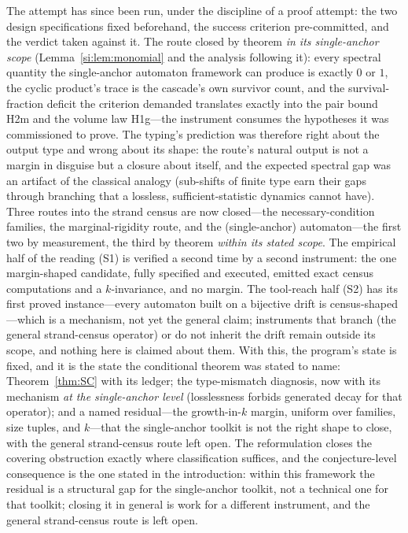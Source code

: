 \documentclass[11pt,a4paper]{article}
\numberwithin{equation}{section}
\theoremstyle{plain}
\theoremstyle{plain}
\theoremstyle{definition}
\theoremstyle{remark}
\begin{document}
The attempt has since been run, under the discipline of a proof
attempt: the two design specifications fixed beforehand, the success
criterion pre-committed, and the verdict taken against it. The route
closed by theorem \emph{in its single-anchor scope}
(Lemma~\ref{si:lem:monomial} and the analysis following it): every spectral
quantity the single-anchor automaton framework can produce is
exactly $0$ or $1$, the cyclic product's trace is the cascade's own
survivor count, and the survival-fraction deficit the criterion
demanded translates exactly into the pair bound H2m and the volume law
H1g---the instrument consumes the hypotheses it was commissioned to
prove. The typing's prediction was therefore right about the output
type and wrong about its shape: the route's natural output is not a
margin in disguise but a closure about itself, and the expected
spectral gap was an artifact of the classical analogy (sub-shifts of
finite type earn their gaps through branching that a lossless,
sufficient-statistic dynamics cannot have). Three routes into the
strand census are now closed---the necessary-condition families, the
marginal-rigidity route, and the (single-anchor) automaton---the first
two by measurement, the third by theorem \emph{within its stated
scope}. The empirical half of the reading (S1) is verified a second
time by a second instrument: the one margin-shaped candidate, fully
specified and executed, emitted exact census computations and a
$k$-invariance, and no margin. The tool-reach half (S2) has its first
proved instance---every automaton built on a bijective drift is
census-shaped---which is a mechanism, not yet the general claim;
instruments that branch (the general strand-census operator) or do not
inherit the drift remain outside its scope, and nothing here is claimed
about them. With this, the program's state is fixed, and it is the
state the conditional theorem was stated to name: Theorem~\ref{thm:SC}
with its ledger; the type-mismatch diagnosis, now with its mechanism
\emph{at the single-anchor level} (losslessness forbids generated decay
for that operator); and a named residual---the growth-in-$k$ margin,
uniform over families, size tuples, and $k$---that the single-anchor
toolkit is not the right shape to close, with the general strand-census
route left open. The reformulation closes the covering obstruction exactly
where classification suffices, and the conjecture-level consequence is
the one stated in the introduction: within this framework the residual
is a structural gap for the single-anchor toolkit, not a technical one
for that toolkit; closing it in general is work for a different
instrument, and the general strand-census route is left open.
\end{document}
